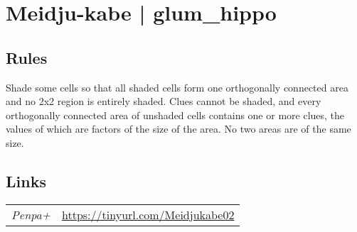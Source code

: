 \section[Meidju-kabe | glum\_hippo {[\emph{Meidjuluk Nurikabe}]}]{Meidju-kabe | {\normalfont glum\_hippo}}
\label{sec:19-meidju-kabe-glum-hippo}

\subsection*{Rules}
\begin{markdown}
Shade some cells so that all shaded cells form one orthogonally connected area and no 2x2 region is entirely shaded. Clues cannot be shaded, and every orthogonally connected area of unshaded cells contains one or more clues, the values of which are factors of the size of the area. No two areas are of the same size.
\end{markdown}
\subsection*{Links}
\begin{tabularx}{\textwidth}{l X}
\emph{Penpa+} & \url{https://tinyurl.com/Meidjukabe02} \\
\end{tabularx}
\pagebreak
